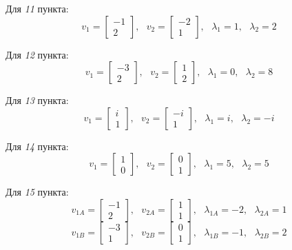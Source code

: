 \documentclass[a4paper,hidelinks,14pt]{extarticle}
\begin{document}
	Для \textit{11} пункта:
	$$
	v_1=\begin{bmatrix}
		-1 \\ 2
	\end{bmatrix}, \text{ }
	v_2 = \begin{bmatrix}
		-2 \\ 1
	\end{bmatrix}, \text{ }
	\lambda_1 = 1, \text{ }
	\lambda_2 = 2
	$$
	
	Для \textit{12} пункта:
	$$
	v_1=\begin{bmatrix}
		-3 \\ 2
	\end{bmatrix}, \text{ }
	v_2 = \begin{bmatrix}
		1 \\ 2
	\end{bmatrix}, \text{ }
	\lambda_1 = 0, \text{ }
	\lambda_2 = 8
	$$
	
	Для \textit{13} пункта:
	$$
	v_1=\begin{bmatrix}
		i \\ 1
	\end{bmatrix}, \text{ }
	v_2 = \begin{bmatrix}
		-i \\ 1
	\end{bmatrix}, \text{ }
	\lambda_1 = i, \text{ }
	\lambda_2 = -i
	$$
	
	Для \textit{14} пункта:
	$$
	v_1=\begin{bmatrix}
		1 \\ 0
	\end{bmatrix}, \text{ }
	v_2 = \begin{bmatrix}
		0 \\ 1
	\end{bmatrix}, \text{ }
	\lambda_1 = 5, \text{ }
	\lambda_2 = 5
	$$
	
	Для \textit{15} пункта:
	$$
	v_{1A}=\begin{bmatrix}
		-1 \\ 2
	\end{bmatrix}, \text{ }
	v_{2A} = \begin{bmatrix}
		1 \\ 1
	\end{bmatrix}, \text{ }
	\lambda_{1A} = -2, \text{ }
	\lambda_{2A} = 1
	$$
	$$
	v_{1B}=\begin{bmatrix}
		-3 \\ 1
	\end{bmatrix}, \text{ }
	v_{2B} = \begin{bmatrix}
		0 \\ 1
	\end{bmatrix}, \text{ }
	\lambda_{1B} = -1, \text{ }
	\lambda_{2B} = 2
	$$
	
\end{document}
